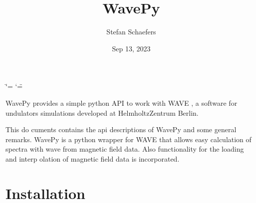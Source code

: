 \documentclass[letterpaper,10pt,english]{sphinxmanual}
\title{WavePy}
\date{Sep 13, 2023}
\author{Stefan Schaefers}
\begin{document}
\ifdefined\shorthandoff
  \ifnum\catcode`\=\string=\active\shorthandoff{=}\fi
  \ifnum\catcode`\"=\active{}\fi
\fi

\pagestyle{empty}
\sphinxmaketitle
\pagestyle{plain}
\sphinxtableofcontents
\pagestyle{normal}
\label{\detokenize{index::doc}}


\sphinxAtStartPar
WavePy provides a simple python API to work with WAVE
,
a software for undulators simulations developed at Helmholtz\sphinxhyphen{}Zentrum Berlin.

\sphinxAtStartPar
This do cuments contains the api descriptions of WavePy and some general
remarks.
WavePy is a python wrapper for WAVE that allows easy calculation of
spectra with wave from magnetic field data. Also functionality for the loading
and interp olation of magnetic field data is incorporated.

\sphinxstepscope


\chapter{Installation}
\label{\detokenize{installation:installation}}\label{\detokenize{installation::doc}}
\end{document}
